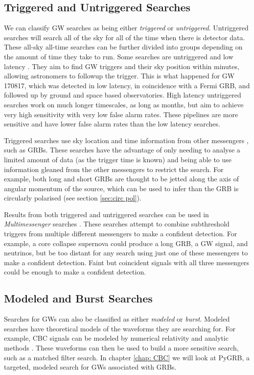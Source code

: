 \documentclass[11pt]{cuthesis}
\begin{document}
\subsection{Triggered and Untriggered Searches}
We can classify GW searches as being either \textit{triggered} or \textit{untriggered}. Untriggered searches will search all of the sky for all of the time when there is detector data. These all-sky all-time searches can be further divided into groups depending on the amount of time they take to run. Some searches are untriggered and low latency \cite{pycbc_live,gstlal_Sachdev:2019,CWB}. They aim to find GW triggers and their sky position within minutes, allowing astronomers to followup the trigger. This is what happened for GW 170817, which was detected in low latency, in coincidence with a Fermi GRB, and followed up by ground and space based observatories. High latency untriggered  searches  \cite{pycbc_Usman:2015,gstlal_Sachdev:2019} work on much longer timescales, as long as months, but aim to achieve very high sensitivity with very low false alarm rates. These pipelines are more sensitive and have lower false alarm rates than the low latency searches. 

Triggered searches use sky location and time information from other messengers \cite{pygrb_Williamson:2014, pygrb_harry,xpipeline}, such as GRBs. These searches have the advantage of only needing to analyse a limited amount of data (as the trigger time is known) and being able to use information gleaned from the other messengers to restrict the search. For example, both long and short GRBs are thought to be jetted along the axis of angular momentum of the source, which can be used to infer than the GRB is circularly polarised (see section \ref{sec:circ pol}).

Results from both triggered and untriggered searches can be used in \textit{Multimessenger} searches \cite{Connaughton:2016umz, Burns_2019}. These searches attempt to combine subthreshold triggers from multiple different messengers to make a confident detection. For example, a core collapse supernova could produce a long GRB, a GW signal, and neutrinos, but be too distant for any search using just one of these messengers to make a confident detection. Faint but coincident signals with all three messengers could be enough to make a confident detection.

\subsection{Modeled and Burst Searches}
Searches for GWs can also be classified as either \textit{modeled} or \textit{burst}. Modeled searches have theoretical models of the waveforms they are searching for. For example, CBC signals can be modeled by numerical relativity and analytic methods \cite{phenom_Khan:2015}. These waveforms can then be used to build a more sensitive search, such as a matched filter search. In chapter \ref{chap: CBC} we will look at PyGRB, a targeted, modeled search for GWs associated with GRBs. 
\end{document}
